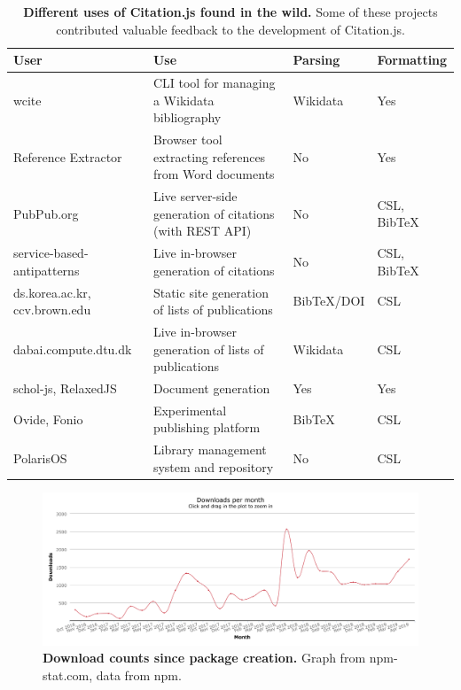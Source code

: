 \documentclass[fleqn,10pt,lineno]{wlpeerj} %
\begin{document}
\begin{table}[bt]
\caption{\textbf{Different uses of Citation.js found in the wild.} Some of these projects contributed valuable feedback to the development of Citation.js.}
\label{table:uses}
\begin{tabular}{|p{3cm}|p{6cm}|l|l|}
\hline
\textbf{User}       & \textbf{Use}                                             & \textbf{Parsing} & \textbf{Formatting} \\ \hline
wcite                         & CLI tool for managing a Wikidata bibliography            & Wikidata         & Yes                 \\ \hline
Reference Extractor           & Browser tool extracting references from Word documents   & No               & Yes                 \\ \hline
PubPub.org                    & Live server-side generation of citations (with REST API) & No               & CSL, BibTeX         \\ \hline
service-based-antipatterns    & Live in-browser generation of citations                  & No               & CSL, BibTeX         \\ \hline
ds.korea.ac.kr, ccv.brown.edu & Static site generation of lists of publications          & BibTeX/DOI       & CSL                 \\ \hline
dabai.compute.dtu.dk          & Live in-browser generation of lists of publications      & Wikidata         & CSL                 \\ \hline
schol-js, RelaxedJS           & Document generation                                      & Yes              & Yes                 \\ \hline
Ovide, Fonio                  & Experimental publishing platform                         & BibTeX           & CSL                 \\ \hline
PolarisOS                     & Library management system and repository                 & No               & CSL                 \\ \hline
\end{tabular}
\end{table}

\begin{figure}[bt]
\centering
\includegraphics[width=\linewidth]{figures/download_counts.png}
\caption{\textbf{Download counts since package creation.} Graph from npm-stat.com, data from npm.}
\label{fig:downloads}
\end{figure}
\end{document}
